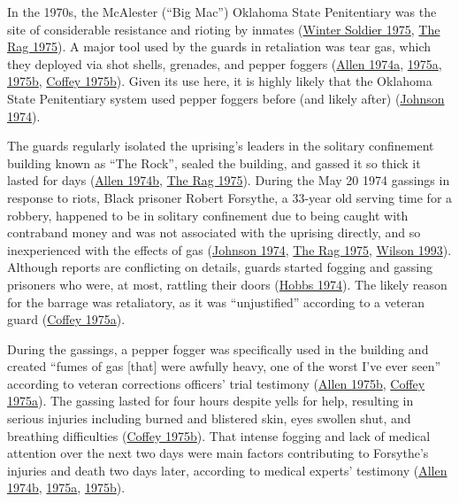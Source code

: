 \documentclass[
  11pt,
]{krantz}
\begin{document}
In the 1970s, the McAlester (``Big Mac'') Oklahoma State Penitentiary was the site of considerable resistance and rioting by inmates (\protect\hyperlink{ref-WinterSoldier1975}{Winter Soldier 1975}, \protect\hyperlink{ref-TheRag1975}{The Rag 1975}).
A major tool used by the guards in retaliation was tear gas, which they deployed via shot shells, grenades, and pepper foggers (\protect\hyperlink{ref-Allen1974a}{Allen 1974a}, \protect\hyperlink{ref-Allen1975a}{1975a}, \protect\hyperlink{ref-Allen1975b}{1975b}, \protect\hyperlink{ref-Coffey1975b}{Coffey 1975b}).
Given its use here, it is highly likely that the Oklahoma State Penitentiary system used pepper foggers before (and likely after) (\protect\hyperlink{ref-Johnson1974}{Johnson 1974}).

The guards regularly isolated the uprising's leaders in the solitary confinement building known as ``The Rock'', sealed the building, and gassed it so thick it lasted for days (\protect\hyperlink{ref-Allen1974b}{Allen 1974b}, \protect\hyperlink{ref-TheRag1975}{The Rag 1975}).
During the May 20 1974 gassings in response to riots, Black prisoner Robert Forsythe, a 33-year old serving time for a robbery, happened to be in solitary confinement due to being caught with contraband money and was not associated with the uprising directly, and so inexperienced with the effects of gas (\protect\hyperlink{ref-Johnson1974}{Johnson 1974}, \protect\hyperlink{ref-TheRag1975}{The Rag 1975}, \protect\hyperlink{ref-Wilson1993}{Wilson 1993}).
Although reports are conflicting on details, guards started fogging and gassing prisoners who were, at most, rattling their doors (\protect\hyperlink{ref-Hobbs1974}{Hobbs 1974}).
The likely reason for the barrage was retaliatory, as it was ``unjustified'' according to a veteran guard (\protect\hyperlink{ref-Coffey1975a}{Coffey 1975a}).

During the gassings, a pepper fogger was specifically used in the building and created ``fumes of gas {[}that{]} were awfully heavy, one of the worst I've ever seen'' according to veteran corrections officers' trial testimony (\protect\hyperlink{ref-Allen1975b}{Allen 1975b}, \protect\hyperlink{ref-Coffey1975a}{Coffey 1975a}).
The gassing lasted for four hours despite yells for help, resulting in serious injuries including burned and blistered skin, eyes swollen shut, and breathing difficulties (\protect\hyperlink{ref-Coffey1975b}{Coffey 1975b}).
That intense fogging and lack of medical attention over the next two days were main factors contributing to Forsythe's injuries and death two days later, according to medical experts' testimony (\protect\hyperlink{ref-Allen1974b}{Allen 1974b}, \protect\hyperlink{ref-Allen1975a}{1975a}, \protect\hyperlink{ref-Allen1975b}{1975b}).
\end{document}
